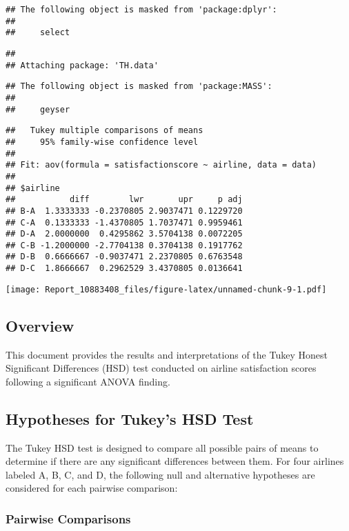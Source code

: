 \documentclass[
]{article}
\begin{document}
\begin{verbatim}
## The following object is masked from 'package:dplyr':
## 
##     select
\end{verbatim}

\begin{verbatim}
## 
## Attaching package: 'TH.data'
\end{verbatim}

\begin{verbatim}
## The following object is masked from 'package:MASS':
## 
##     geyser
\end{verbatim}

\begin{verbatim}
##   Tukey multiple comparisons of means
##     95% family-wise confidence level
## 
## Fit: aov(formula = satisfactionscore ~ airline, data = data)
## 
## $airline
##           diff        lwr       upr     p adj
## B-A  1.3333333 -0.2370805 2.9037471 0.1229720
## C-A  0.1333333 -1.4370805 1.7037471 0.9959461
## D-A  2.0000000  0.4295862 3.5704138 0.0072205
## C-B -1.2000000 -2.7704138 0.3704138 0.1917762
## D-B  0.6666667 -0.9037471 2.2370805 0.6763548
## D-C  1.8666667  0.2962529 3.4370805 0.0136641
\end{verbatim}

\texttt{[image: Report\_10883408\_files/figure-latex/unnamed-chunk-9-1.pdf]}

\subsection{Overview}\label{overview}

This document provides the results and interpretations of the Tukey
Honest Significant Differences (HSD) test conducted on airline
satisfaction scores following a significant ANOVA finding.

\subsection{Hypotheses for Tukey's HSD
Test}\label{hypotheses-for-tukeys-hsd-test}

The Tukey HSD test is designed to compare all possible pairs of means to
determine if there are any significant differences between them. For
four airlines labeled A, B, C, and D, the following null and alternative
hypotheses are considered for each pairwise comparison:

\subsubsection{Pairwise Comparisons}\label{pairwise-comparisons}
\end{document}
